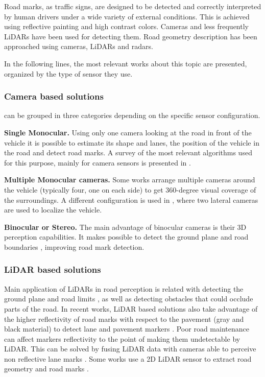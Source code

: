 Road marks, as traffic signs, are designed to be detected and 
correctly interpreted by human drivers under a wide variety of external 
conditions. This is achieved using reflective painting and high contrast 
colors. Cameras and less frequently LiDARs have been used for detecting them.
Road geometry description has been approached using cameras, LiDARs and radars.

In the following lines, the most relevant works about this topic are presented, 
organized by the type of sensor they use.


\subsubsection{Camera based solutions}
can be grouped in three categories depending on the specific sensor 
configuration.

\textbf{Single Monocular.}
Using only one 
camera looking at the road in front of the vehicle it is possible to estimate 
its shape and lanes, the position of the vehicle in the road and  
detect road marks. A survey of the most 
relevant algorithms used for this purpose, mainly for camera sensors is 
presented in \cite{hillel2014recent}.

\textbf{Multiple Monocular cameras.} 
Some works \cite{lee2017avm, kum2013lane} arrange multiple cameras 
around the vehicle (typically four, one on each side) to get 360-degree 
visual coverage of the surroundings. 
A different configuration is used in \cite{Ieng2003}, where two lateral cameras
are used to localize the vehicle. 

\textbf{Binocular or Stereo.} 
The main advantage of binocular cameras is their 3D perception capabilities.
It makes possible to detect the ground plane and road boundaries 
\cite{schreiber2013laneloc, ozgunalp2017multiple}, improving road mark 
detection. 

\subsubsection{LiDAR based solutions}
Main application of LiDARs in road perception is related with detecting the 
ground plane and road limits \cite{pengpeng20193d}, as well as detecting obstacles that could occlude 
parts of the road.
In recent works, LiDAR based solutions also take advantage of the higher 
reflectivity of road marks with respect to the pavement (gray and black 
material) to detect lane \cite{yang2012automated, li2013new} and
pavement markers \cite{Zhang2016}.
Poor road maintenance can affect markers reflectivity to the point of making 
them undetectable by LiDAR. This can be solved by fusing LiDAR 
data with cameras able to perceive non reflective lane marks \cite{lee2017avm}.
Some works use a 2D LiDAR sensor to extract road geometry and road marks 
\cite{nie2012camera, kim2015lane}.

